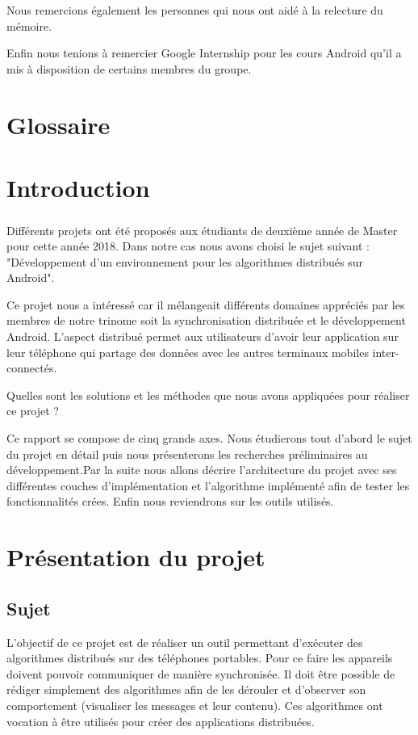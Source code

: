 \documentclass[a4paper,10pt]{report}
\begin{document}
Nous remercions également les personnes qui nous ont aidé à la relecture du mémoire.

Enfin nous tenions à remercier Google Internship  pour les cours Android qu'il a mis à disposition de certains membres du groupe.
\begin{changemargin}
\tableofcontents
\end{changemargin}
\chapter*{Glossaire}

\chapter{Introduction}
  \paragraph{}
  Différents projets ont été proposés aux étudiants de deuxième année de Master pour cette année 2018. Dans notre cas nous avons choisi le sujet suivant : "Développement d’un environnement pour les algorithmes distribués sur Android".
  
  Ce projet nous a intéressé car il mélangeait différents domaines appréciés par les membres de notre trinome soit la synchronisation distribuée et le développement Android.
  L'aspect distribué permet aux utilisateurs d'avoir leur application sur leur téléphone qui partage des données avec les autres terminaux mobiles inter-connectés.
  
  Quelles sont les solutions et les méthodes que nous avons appliquées pour réaliser ce projet ?
  
  Ce rapport se compose de cinq grands axes. Nous étudierons tout d'abord le sujet du projet en détail puis nous présenterons les recherches préliminaires au développement.Par la suite nous allons décrire l'architecture du projet avec ses différentes couches d'implémentation et l'algorithme implémenté afin de tester les fonctionnalités crées. Enfin nous reviendrons sur les outils utilisés.
\chapter{Présentation du projet}
  \section{Sujet}
  L'objectif de ce projet est de réaliser un outil permettant d'exécuter des algorithmes distribués sur des téléphones portables. Pour ce faire les appareils doivent pouvoir communiquer de manière synchronisée. Il doit être possible de rédiger simplement des algorithmes afin de les dérouler et d'observer son comportement (visualiser les messages et leur contenu). Ces algorithmes ont vocation à être utilisés pour créer des applications distribuées.
  
\end{document}

